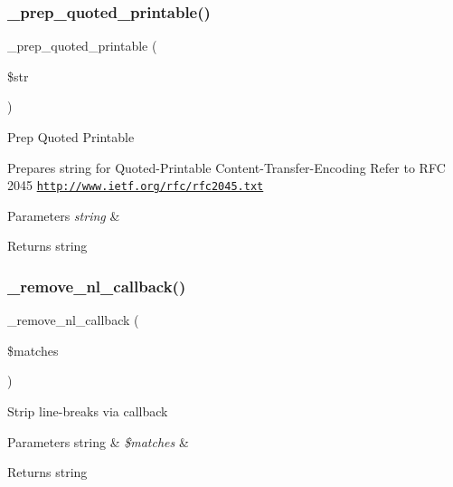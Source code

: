 \subsubsection{\texorpdfstring{\+\_\+prep\+\_\+quoted\+\_\+printable()}{\_prep\_quoted\_printable()}}
{\footnotesize\ttfamily \+\_\+prep\+\_\+quoted\+\_\+printable (\begin{DoxyParamCaption}\item[{}]{\$str }\end{DoxyParamCaption})\hspace{0.3cm}{\ttfamily [protected]}}

Prep Quoted Printable

Prepares string for Quoted-\/\+Printable Content-\/\+Transfer-\/\+Encoding Refer to R\+FC 2045 \href{http://www.ietf.org/rfc/rfc2045.txt}{\tt http\+://www.\+ietf.\+org/rfc/rfc2045.\+txt}


\begin{DoxyParams}{Parameters}
{\em string} & \\
\hline
\end{DoxyParams}
\begin{DoxyReturn}{Returns}
string 
\end{DoxyReturn}
\mbox{\label{class_c_i___email_a3a624f07cca99fe6ab1b61dbec56eef8}} 
\subsubsection{\texorpdfstring{\+\_\+remove\+\_\+nl\+\_\+callback()}{\_remove\_nl\_callback()}}
{\footnotesize\ttfamily \+\_\+remove\+\_\+nl\+\_\+callback (\begin{DoxyParamCaption}\item[{}]{\$matches }\end{DoxyParamCaption})\hspace{0.3cm}{\ttfamily [protected]}}

Strip line-\/breaks via callback


\begin{DoxyParams}[1]{Parameters}
string & {\em \$matches} & \\
\hline
\end{DoxyParams}
\begin{DoxyReturn}{Returns}
string 
\end{DoxyReturn}
\mbox{\label{class_c_i___email_a5431c3309ee720b3d1cc55c892359371}} 
